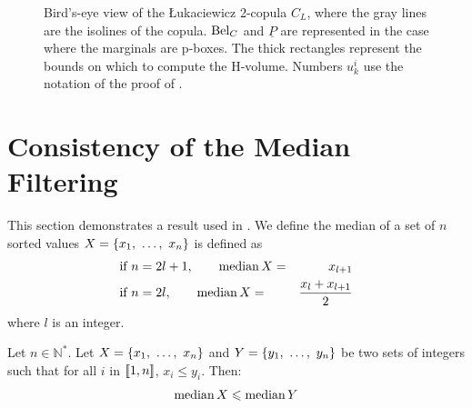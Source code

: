 \begin{figure}[!ht]
    \caption{Bird's-eye view of the \L ukaciewicz 2-copula $C_L$, where the gray lines are the isolines of the copula. $\mathrm{Bel}_C$ and $\underline{P}$ are represented in the case where the marginals are p-boxes. The thick rectangles represent the bounds on which to compute the H-volume. Numbers $u^i_k$ use the notation of the proof of .}
    \label{fig:copula_convex}
 
\end{figure}
\section{Consistency of the Median Filtering}\label{sec:median_filtering}
This section demonstrates a result used in . We define the median of a set of $n$ sorted values $X=\{x_1, ~\ldots, ~ x_n\}$ is defined as
    \begin{align}
        &\text{if }n=2l+1,\qquad \operatorname*{median} X =& x_{l+1}\\
        &\text{if }n=2l,\qquad \operatorname*{median} X =& \frac{x_{l}+x_{l+1}}{2}
    \end{align}
    where $l$ is an integer.

\begin{proposition}\label{prop:median_consistency}
    Let $n\in\mathbb{N}^*$. Let $X=\{x_1, ~\ldots, ~ x_n\}$ and $Y=\{y_1, ~\ldots, ~ y_n\}$ be two sets of integers such that for all $i$ in $[\![1,n]\!]$, $x_i\leqslant y_i$. Then:
    \begin{align}
        \operatorname*{median} X \leqslant \operatorname*{median} Y
    \end{align}
\end{proposition}

